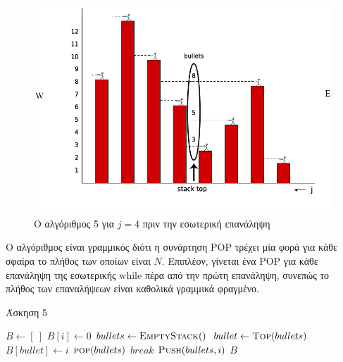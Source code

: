 \documentclass[11pt,a4paper]{book}
\begin{document}
\begin{figure}
	\caption{Ο αλγόριθμος 5 για $j = 4$ πριν την εσωτερική επανάληψη}
	\includegraphics[width=1\textwidth]{5.png}
\end{figure}

Ο αλγόριθμος είναι γραμμικός διότι η συνάρτηση \textlatin{POP} τρέχει μία φορά για κάθε σφαίρα το πλήθος των οποίων είναι $N$. Επιπλέον, γίνεται ένα \textlatin{POP} για κάθε επανάληψη της εσωτερικής \textlatin{while} πέρα από την πρώτη επανάληψη, συνεπώς το πλήθος των επαναλήψεων είναι καθολικά γραμμικά φραγμένο.

\begin{algorithm}[H]
\caption{\textgreek{Άσκηση 5}}
\begin{algorithmic}[1]
    \State $B \gets [\ ]$
   		\State $B[ i ] \gets 0$
   	\EndFor
    \State $bullets \gets \Call{EmptyStack}$
            \State $bullet \gets \Call{Top}{bullets}$
                \State $B[ bullet ] \gets i$
                \State $\Call{pop}{bullets}$
            \Else
                \State $break$
            \EndIf
        \EndWhile
        \State $\Call{Push}{bullets, i}$
    \EndFor
    \State \Return $B$
\EndProcedure
\end{algorithmic}
\end{algorithm}

\end{document}
